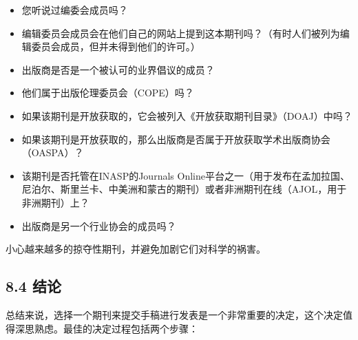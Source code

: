 \begin{itemize}
\item 您听说过编委会成员吗？
\item 编辑委员会成员会在他们自己的网站上提到这本期刊吗？（有时人们被列为编辑委员会成员，但并未得到他们的许可。）
\item 出版商是否是一个被认可的业界倡议的成员？
\item 他们属于出版伦理委员会（COPE）吗？
\item 如果该期刊是开放获取的，它会被列入《开放获取期刊目录》（DOAJ）中吗？
\item 如果该期刊是开放获取的，那么出版商是否属于开放获取学术出版商协会（OASPA）？
\item 该期刊是否托管在INASP的Journals Online平台之一（用于发布在孟加拉国、尼泊尔、斯里兰卡、中美洲和蒙古的期刊）或者非洲期刊在线（AJOL，用于非洲期刊）上？
\item 出版商是另一个行业协会的成员吗？
\end{itemize}

小心越来越多的掠夺性期刊，并避免加剧它们对科学的祸害。

\subsection*{8.4 结论}
总结来说，选择一个期刊来提交手稿进行发表是一个非常重要的决定，这个决定值得深思熟虑。最佳的决定过程包括两个步骤：

